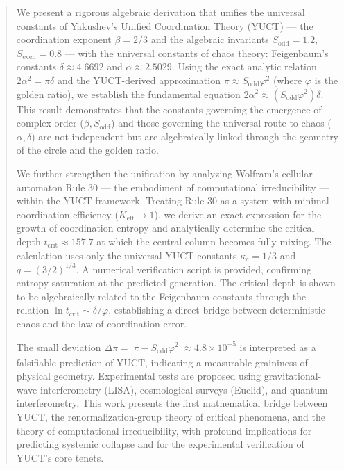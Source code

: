 \documentclass[11pt,a4paper]{article}
\begin{document}
	\newpage
	\begin{abstract}
		\noindent
		We present a rigorous algebraic derivation that unifies the universal constants of Yakushev's Unified Coordination Theory (YUCT) — the coordination exponent \(\beta = 2/3\) and the algebraic invariants \(S_{\mathrm{odd}} = 1.2\), \(S_{\mathrm{even}} = 0.8\) — with the universal constants of chaos theory: Feigenbaum's constants \(\delta \approx 4.6692\) and \(\alpha \approx 2.5029\). Using the exact analytic relation \(2\alpha^2 = \pi\delta\) and the YUCT-derived approximation \(\pi \approx S_{\mathrm{odd}}\varphi^2\) (where \(\varphi\) is the golden ratio), we establish the fundamental equation \(2\alpha^2 \approx (S_{\mathrm{odd}}\varphi^2)\delta\). This result demonstrates that the constants governing the emergence of complex order (\(\beta, S_{\mathrm{odd}}\)) and those governing the universal route to chaos (\(\alpha, \delta\)) are not independent but are algebraically linked through the geometry of the circle and the golden ratio.
		
		We further strengthen the unification by analyzing Wolfram's cellular automaton Rule 30 — the embodiment of computational irreducibility — within the YUCT framework. Treating Rule 30 as a system with minimal coordination efficiency (\(K_{\mathrm{eff}} \to 1\)), we derive an exact expression for the growth of coordination entropy and analytically determine the critical depth \(t_{\mathrm{crit}} \approx 157.7\) at which the central column becomes fully mixing. The calculation uses only the universal YUCT constants \(\kappa_c = 1/3\) and \(q = (3/2)^{1/3}\). A numerical verification script is provided, confirming entropy saturation at the predicted generation. The critical depth is shown to be algebraically related to the Feigenbaum constants through the relation \(\ln t_{\mathrm{crit}} \sim \delta/\varphi\), establishing a direct bridge between deterministic chaos and the law of coordination error.
		
		The small deviation \(\Delta\pi = |\pi - S_{\mathrm{odd}}\varphi^2| \approx 4.8\times10^{-5}\) is interpreted as a falsifiable prediction of YUCT, indicating a measurable graininess of physical geometry. Experimental tests are proposed using gravitational-wave interferometry (LISA), cosmological surveys (Euclid), and quantum interferometry. This work presents the first mathematical bridge between YUCT, the renormalization-group theory of critical phenomena, and the theory of computational irreducibility, with profound implications for predicting systemic collapse and for the experimental verification of YUCT's core tenets.
	\end{abstract}
	
\end{document}

